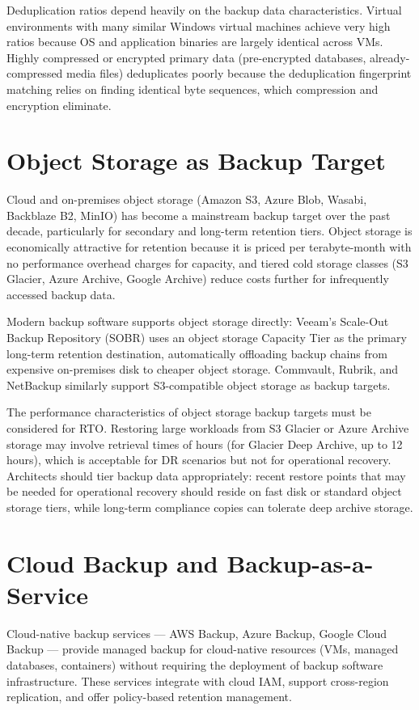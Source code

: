 Deduplication ratios depend heavily on the backup data characteristics. Virtual environments with many similar Windows virtual machines achieve very high ratios because OS and application binaries are largely identical across VMs. Highly compressed or encrypted primary data (pre-encrypted databases, already-compressed media files) deduplicates poorly because the deduplication fingerprint matching relies on finding identical byte sequences, which compression and encryption eliminate.

\section{Object Storage as Backup Target}
Cloud and on-premises object storage (Amazon S3, Azure Blob, Wasabi, Backblaze B2, MinIO) has become a mainstream backup target over the past decade, particularly for secondary and long-term retention tiers. Object storage is economically attractive for retention because it is priced per terabyte-month with no performance overhead charges for capacity, and tiered cold storage classes (S3 Glacier, Azure Archive, Google Archive) reduce costs further for infrequently accessed backup data.

Modern backup software supports object storage directly: Veeam's Scale-Out Backup Repository (SOBR) uses an object storage Capacity Tier as the primary long-term retention destination, automatically offloading backup chains from expensive on-premises disk to cheaper object storage. Commvault, Rubrik, and NetBackup similarly support S3-compatible object storage as backup targets.

The performance characteristics of object storage backup targets must be considered for RTO. Restoring large workloads from S3 Glacier or Azure Archive storage may involve retrieval times of hours (for Glacier Deep Archive, up to 12 hours), which is acceptable for DR scenarios but not for operational recovery. Architects should tier backup data appropriately: recent restore points that may be needed for operational recovery should reside on fast disk or standard object storage tiers, while long-term compliance copies can tolerate deep archive storage.

\section{Cloud Backup and Backup-as-a-Service}
Cloud-native backup services --- AWS Backup, Azure Backup, Google Cloud Backup --- provide managed backup for cloud-native resources (VMs, managed databases, containers) without requiring the deployment of backup software infrastructure. These services integrate with cloud IAM, support cross-region replication, and offer policy-based retention management.

